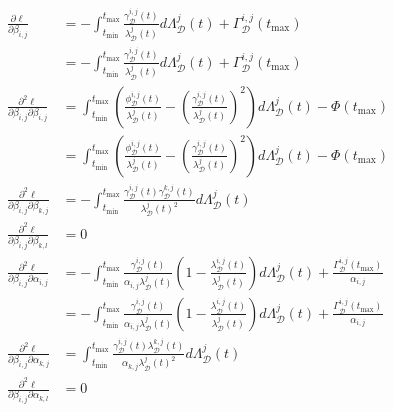 \documentclass[honours,12pt]{unswthesis}
\numberwithin{equation}{section}
\begin{document}
\begin{equation*}
	\begin{align}
		\frac{\partial\ell}{\partial\beta_{i,j}} &= -\int_{t_\mathrm{min}}^{t_\mathrm{max}}\frac{\gamma_\mathcal{D}^{i,j}(t)}{\lambda_\mathcal{D}^{j}(t)}d\Lambda_\mathcal{D}^j(t) + \Gamma_\mathcal{D}^{i,j}(t_\mathrm{max}) \\
		&= -\int_{t_\mathrm{min}}^{t_\mathrm{max}}\frac{\gamma_\mathcal{D}^{i,j}(t)}{\lambda_\mathcal{D}^{j}(t)}d\Lambda_\mathcal{D}^j(t) + \Gamma_\mathcal{D}^{i,j}(t_\mathrm{max}) \\
		\frac{\partial^2\ell}{\partial\beta_{i,j}\partial\beta_{i,j}} &= \int_{t_\mathrm{min}}^{t_\mathrm{max}} \left( \frac{\phi_\mathcal{D}^{i,j}(t)}{\lambda_\mathcal{D}^{j}(t)} - \left(\frac{\gamma_\mathcal{D}^{i,j}(t)}{\lambda_\mathcal{D}^{j}(t)}\right)^2 \right) d\Lambda_\mathcal{D}^j(t) - \Phi(t_\mathrm{max}) \\
		&= \int_{t_\mathrm{min}}^{t_\mathrm{max}} \left( \frac{\phi_\mathcal{D}^{i,j}(t)}{\lambda_\mathcal{D}^{j}(t)} - \left(\frac{\gamma_\mathcal{D}^{i,j}(t)}{\lambda_\mathcal{D}^{j}(t)}\right)^2 \right) d\Lambda_\mathcal{D}^j(t) - \Phi(t_\mathrm{max}) \\
		\frac{\partial^2\ell}{\partial\beta_{i,j}\partial\beta_{k,j}} &= -\int_{t_\mathrm{min}}^{t_\mathrm{max}}\frac{\gamma_\mathcal{D}^{i,j}(t)\gamma_\mathcal{D}^{k,j}(t)}{\lambda_\mathcal{D}^{j}(t)^2}d\Lambda_\mathcal{D}^j(t) \\
		\frac{\partial^2\ell}{\partial\beta_{i,j}\partial\beta_{k,l}} &= 0\\
		\frac{\partial^2\ell}{\partial\beta_{i,j}\partial\alpha_{i,j}} &= -\int_{t_\mathrm{min}}^{t_\mathrm{max}} \frac{\gamma_\mathcal{D}^{i,j}(t)}{\alpha_{i,j}\lambda_\mathcal{D}^{j}(t)} \left( 1 - \frac{\lambda_\mathcal{D}^{i,j}(t)}{\lambda_\mathcal{D}^{j}(t)} \right) d\Lambda_\mathcal{D}^j(t) + \frac{\Gamma_\mathcal{D}^{i,j}(t_\mathrm{max})}{\alpha_{i,j}} \\
		&= -\int_{t_\mathrm{min}}^{t_\mathrm{max}} \frac{\gamma_\mathcal{D}^{i,j}(t)}{\alpha_{i,j}\lambda_\mathcal{D}^{j}(t)} \left( 1 - \frac{\lambda_\mathcal{D}^{i,j}(t)}{\lambda_\mathcal{D}^{j}(t)} \right) d\Lambda_\mathcal{D}^j(t) + \frac{\Gamma_\mathcal{D}^{i,j}(t_\mathrm{max})}{\alpha_{i,j}} \\
		\frac{\partial^2\ell}{\partial\beta_{i,j}\partial\alpha_{k,j}} &= \int_{t_\mathrm{min}}^{t_\mathrm{max}}\frac{\gamma_\mathcal{D}^{i,j}(t)\lambda_\mathcal{D}^{k,j}(t)}{\alpha_{k,j}\lambda_\mathcal{D}^{j}(t)^2}d\Lambda_\mathcal{D}^j(t) \\
		\frac{\partial^2\ell}{\partial\beta_{i,j}\partial\alpha_{k,l}} &= 0
	\end{align}
\end{equation*}
\end{document}
